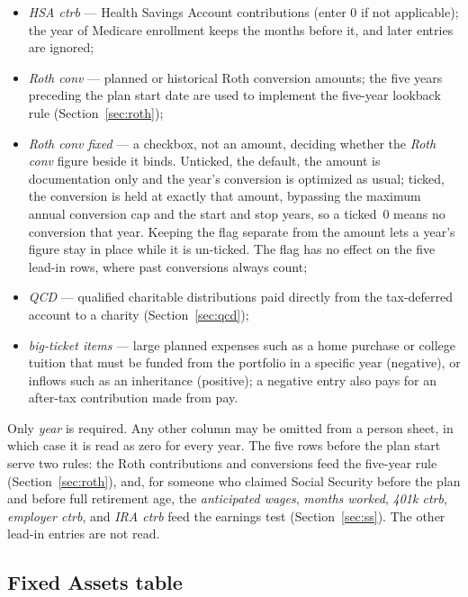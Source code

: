 \documentclass[fleqn,12pt]{report}
\begin{document}
\begin{itemize}[nosep]
  \item \textit{HSA ctrb} --- Health Savings Account contributions (enter 0 if
    not applicable); the year of Medicare enrollment keeps the months before it,
    and later entries are ignored;
  \item \textit{Roth conv} --- planned or historical Roth conversion amounts;
    the five years preceding the plan start date are used to implement the
    five-year lookback rule (Section~\ref{sec:roth});
  \item \textit{Roth conv fixed} --- a checkbox, not an amount, deciding whether
    the \textit{Roth conv} figure beside it binds.  Unticked, the default, the
    amount is documentation only and the year's conversion is optimized as usual;
    ticked, the conversion is held at exactly that amount, bypassing the maximum
    annual conversion cap and the start and stop years, so a ticked~0 means no
    conversion that year.  Keeping the flag separate from the amount lets a year's
    figure stay in place while it is un-ticked.  The flag has no effect on the five
    lead-in rows, where past conversions always count;
  \item \textit{QCD} --- qualified charitable distributions paid directly from
    the tax-deferred account to a charity (Section~\ref{sec:qcd});
  \item \textit{big-ticket items} --- large planned expenses such as a home
    purchase or college tuition that must be funded from the portfolio in a
    specific year (negative), or inflows such as an inheritance (positive); a
    negative entry also pays for an after-tax contribution made from pay.
\end{itemize}

Only \textit{year} is required. Any other column may be omitted from a person
sheet, in which case it is read as zero for every year.
The five rows before the plan start serve two rules: the Roth contributions and
conversions feed the five-year rule (Section~\ref{sec:roth}), and, for someone who
claimed Social Security before the plan and before full retirement age, the
\textit{anticipated wages}, \textit{months worked}, \textit{401k ctrb},
\textit{employer ctrb}, and \textit{IRA ctrb} feed the earnings test
(Section~\ref{sec:ss}). The other lead-in entries are not read.

\subsection*{Fixed Assets table}
\end{document}

